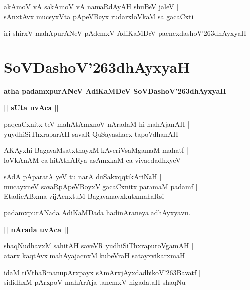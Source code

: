 \documentclass[twoside,12pt,openright]{book}
\def\S{\char'263}
\newcounter{shloka}[chapter]
\def\uvaca#1{\centerline{{\large\textbf{#1}}}}
\begin{document}
\begin{shloka}
akAmoV vA sakAmoV vA namaRdAyAH shuBeV jaleV |\\
sAnxtAvx muceyxVta pApeVBoyx rudarxloVkaM sa gacaCxti
\end{shloka}

\begin{center}
iri shirxV mahApurANeV pAdemxV AdiKaMDeV pacncxdashoV\S dhAyxyaH
\end{center}

\chapter{SoVDashoV\S dhAyxyaH}

\begin{center}
{\LARGE\bfseries atha padamxpurANeV AdiKaMDeV SoVDashoV\S dhAyxyaH}
\end{center}

\uvaca{|| sUta uvAca ||}

\begin{shloka}
paqcaCxnitx teV mahAtAmxnoV nAradaM hi mahAjanAH |\\
yuydhiSiThxraparAH savaR QuSayashacx tapoVdhanAH \\
\end{shloka}

\begin{shloka}
AKAyxhi BagavaMsatxthayxM kAveriVsaMgamaM mahatf |\\
loVkAnAM ca hitAthARya asAmxkaM ca vivaqdadhxyeV 
\end{shloka}

\begin{shloka}
sAdA pAparatA yeV tu narA duSakxqqtikAriNaH |\\
mucayxneV savaRpApeVBoyxV gacaCxnitx paramaM padamf |\\
EtadicABxma vijAcnxtuM BagavanavxkutxmahaRsi
\end{shloka}

\begin{center}
padamxpurANada AdiKaMDada hadinAraneya adhAyxyavu.
\end{center}

\uvaca{|| nArada uvAca ||}
\begin{shloka}
shaqNudhavxM sahitAH saveVR yudhiSiThxrapuroVgamAH |\\
atarx kaqtAvx mahAyajacnxM kubeVraH satayxvikarxmaH 
\end{shloka}

\begin{shloka}
idaM tiVthaRmanupArxpayx sAmArxjAyxdadhikoV\S Bavatf |\\
sididhxM pArxpoV mahArAja tanemxV nigadataH shaqNu
\end{shloka}
\end{document}
